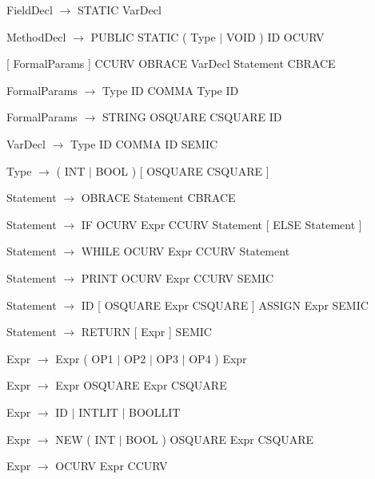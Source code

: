 \documentclass[11pt,a4paper]{article}
\begin{document}
\hspace{-1cm}FieldDecl $\rightarrow$ STATIC VarDecl

\hspace{-1cm}MethodDecl $\rightarrow$ PUBLIC STATIC ( Type $\mid$ VOID ) ID OCURV

[ FormalParams ] CCURV OBRACE { VarDecl } { Statement } CBRACE

\hspace{-1cm}FormalParams $\rightarrow$ Type ID { COMMA Type ID }

\hspace{-1cm}FormalParams $\rightarrow$ STRING OSQUARE CSQUARE ID

\hspace{-1cm}VarDecl $\rightarrow$ Type ID { COMMA ID } SEMIC

\hspace{-1cm}Type $\rightarrow$ ( INT $\mid$ BOOL ) [ OSQUARE CSQUARE ]

\hspace{-1cm}Statement $\rightarrow$ OBRACE { Statement } CBRACE

\hspace{-1cm}Statement $\rightarrow$ IF OCURV Expr CCURV Statement [ ELSE Statement ]

\hspace{-1cm}Statement $\rightarrow$ WHILE OCURV Expr CCURV Statement

\hspace{-1cm}Statement $\rightarrow$ PRINT OCURV Expr CCURV SEMIC

\hspace{-1cm}Statement $\rightarrow$ ID [ OSQUARE Expr CSQUARE ] ASSIGN Expr SEMIC

\hspace{-1cm}Statement $\rightarrow$ RETURN [ Expr ] SEMIC

\hspace{-1cm}Expr $\rightarrow$ Expr ( OP1 $\mid$ OP2 $\mid$ OP3 $\mid$ OP4 ) Expr

\hspace{-1cm}Expr $\rightarrow$ Expr OSQUARE Expr CSQUARE

\hspace{-1cm}Expr $\rightarrow$ ID $\mid$ INTLIT $\mid$ BOOLLIT

\hspace{-1cm}Expr $\rightarrow$ NEW ( INT $\mid$ BOOL ) OSQUARE Expr CSQUARE

\hspace{-1cm}Expr $\rightarrow$ OCURV Expr CCURV
\end{document}

